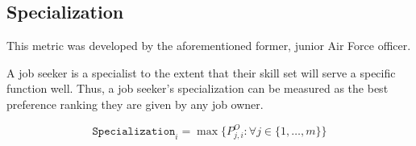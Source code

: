 \subsection{Specialization}

This metric was developed by the aforementioned former, junior Air Force officer.

A job seeker is a specialist to the extent that their skill set will serve a specific function well. Thus, a job seeker's specialization can be measured as the best preference ranking they are given by any job owner.

\[\texttt{Specialization}_i = \max \{P^O_{j,i} : \forall j \in \{1, \dots, m\} \}\]